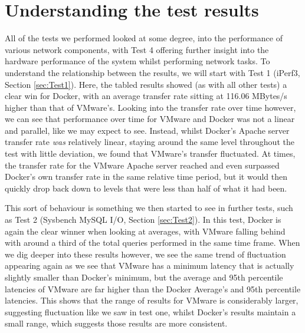 \section{Understanding the test results}
All of the tests we performed looked at some degree, into the performance of various network components, with Test 4 offering further insight into the hardware performance of the system whilst performing network tasks. To understand the relationship between the results, we will start with Test 1 (iPerf3, Section \ref{sec:Test1}). Here, the tabled results showed (as with all other tests) a clear win for Docker, with an average transfer rate sitting at 116.06 MBytes/s higher than that of VMware's. Looking into the transfer rate over time however, we can see that performance over time for VMware and Docker was not a linear and parallel, like we may expect to see. Instead, whilst Docker's Apache server transfer rate \emph{was} relatively linear, staying around the same level throughout the test with little deviation, we found that VMware's transfer fluctuated. At times, the transfer rate for the VMware Apache server reached and even surpassed Docker's own transfer rate in the same relative time period, but it would then quickly drop back down to levels that were less than half of what it had been.

This sort of behaviour is something we then started to see in further tests, such as Test 2 (Sysbench MySQL I/O, Section \ref{sec:Test2}). In this test, Docker is again the clear winner when looking at averages, with VMware falling behind with around a third of the total queries performed in the same time frame. When we dig deeper into these results however, we see the same trend of fluctuation appearing again as we see that VMware has a minimum latency that is actually slightly smaller than Docker's minimum, but the average and 95th percentile latencies of VMware are far higher than the Docker Average's and 95th percentile latencies. This shows that the range of results for VMware is considerably larger, suggesting fluctuation like we saw in test one, whilst Docker's results maintain a small range, which suggests those results are more consistent.

